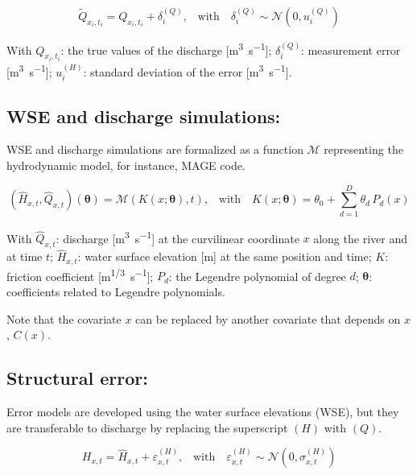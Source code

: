 \documentclass[12pt]{article}
\begin{document}
\begin{equation}
    \tilde{Q}_{x_i,t_i} = Q_{x_i,t_i} + \delta_i^{(Q)} \text{,} \quad \text{with} \quad    \delta_i^{(Q)} \sim \mathcal{N}\left(0, u_i^{(Q)}\right)
\end{equation}

With \( Q_{x_i,t_i} \): the true values of the discharge [\si{\cubic\meter\per\second}];
\(\delta_i^{(Q)}\): measurement error [\si{\cubic\meter\per\second}];
\(u_i^{(H)}\): standard deviation of the error [\si{\cubic\meter\per\second}].

\subsection{\textbf{WSE and discharge simulations: }}

WSE and discharge simulations are formalized as a function \(\mathcal{M}\) representing the hydrodynamic model, for instance, MAGE code.

\begin{equation}
    (\hat{H}_{x,t},\hat{Q}_{x,t})(\boldsymbol{\theta}) = \mathcal{M}(K(x;\boldsymbol{\theta}),t) \text{,} \quad \text{with} \quad K(x;\boldsymbol{\theta}) = \theta_0 + \sum_{d=1}^{D} \theta_d \, P_d(x)
\end{equation}

With \(\hat{Q}_{x,t}\): discharge [\si{\cubic\meter\per\second}] at the curvilinear coordinate \(x\) along the river and at time \(t\); \(\hat{H}_{x,t}\): water surface elevation [\si{\meter}] at the same position and time; 
\(K\): friction coefficient [\si{\meter^{1/3}\per\second}];     
\(P_d\): the Legendre polynomial of degree \(d\); 
\(\boldsymbol{\theta}\): coefficients related to Legendre polynomials.

Note that the covariate \(x\) can be replaced by another covariate that depends on \(x\), \(C(x)\).


\subsection{\textbf{Structural error:}}

Error models are developed using the water surface elevations (WSE), but they are transferable to discharge by replacing the superscript \((H)\) with \((Q)\).

\begin{equation}
    H_{x,t} = \hat{H}_{x,t} + \varepsilon^{(H)}_{x,t} \text{,} \quad \text{with} \quad \varepsilon^{(H)}_{x,t} \sim \mathcal{N}(0, \sigma^{(H)}_{x,t})
\end{equation}
\end{document}
